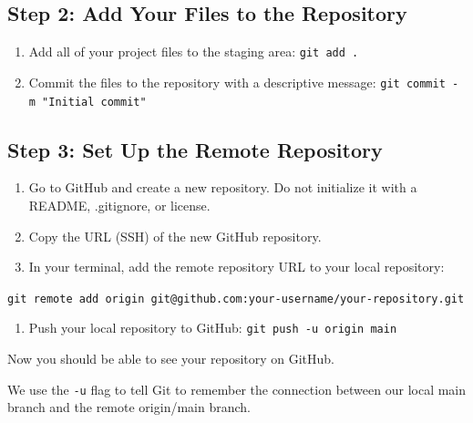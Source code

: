 \documentclass[
  11pt,
  letterpaper,
  DIV=11,
  numbers=noendperiod]{scrartcl}
\providecommand{\tightlist}{%
  \setlength{\itemsep}{0pt}\setlength{\parskip}{0pt}}\usepackage{longtable,booktabs,array}
\let\textttOrig\texttt
\renewcommand{\texttt}[1]{\textttOrig{\colorbox{codebggray}{\textcolor{codefontcolor}{#1}}}}
\begin{document}
\subsection{Step 2: Add Your Files to the
Repository}\label{step-2-add-your-files-to-the-repository}

\begin{enumerate}
\def\labelenumi{\arabic{enumi}.}
\tightlist
\item
  Add all of your project files to the staging area:
  \texttt{git\ add\ .}
\item
  Commit the files to the repository with a descriptive message:
  \texttt{git\ commit\ -m\ "Initial\ commit"}
\end{enumerate}

\subsection{Step 3: Set Up the Remote
Repository}\label{step-3-set-up-the-remote-repository}

\begin{enumerate}
\def\labelenumi{\arabic{enumi}.}
\tightlist
\item
  Go to GitHub and create a new repository. Do not initialize it with a
  README, .gitignore, or license.
\item
  Copy the URL (SSH) of the new GitHub repository.
\item
  In your terminal, add the remote repository URL to your local
  repository:
\end{enumerate}

\texttt{git\ remote\ add\ origin\ git@github.com:your-username/your-repository.git}

\begin{enumerate}
\def\labelenumi{\arabic{enumi}.}
\setcounter{enumi}{3}
\tightlist
\item
  Push your local repository to GitHub:
  \texttt{git\ push\ -u\ origin\ main}
\end{enumerate}

Now you should be able to see your repository on GitHub.

\begin{tcolorbox}[enhanced jigsaw, opacityback=0, coltitle=black, bottomrule=.15mm, opacitybacktitle=0.6, breakable, colbacktitle=quarto-callout-tip-color!10!white, title=\textcolor{quarto-callout-tip-color}{\faLightbulb}\hspace{0.5em}{Tip}, left=2mm, rightrule=.15mm, toprule=.15mm, leftrule=.75mm, bottomtitle=1mm, toptitle=1mm, colback=white, titlerule=0mm, arc=.35mm, colframe=quarto-callout-tip-color-frame]

We use the \texttt{-u} flag to tell Git to remember the connection
between our local main branch and the remote origin/main branch.

\end{tcolorbox}
\end{document}

